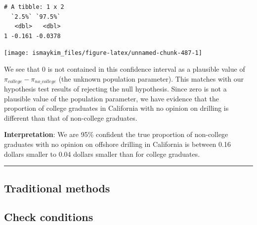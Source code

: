 \documentclass[12pt,]{krantz}
\makeatletter
\newenvironment{Shaded}{\begin{snugshade}}{\end{snugshade}}
\newcommand{\KeywordTok}[1]{\textcolor[rgb]{0.27,0.27,0.27}{\textbf{#1}}}
\newcommand{\DataTypeTok}[1]{\textcolor[rgb]{0.27,0.27,0.27}{#1}}
\newcommand{\StringTok}[1]{\textcolor[rgb]{0.5,0.5,0.5}{#1}}
\newcommand{\OperatorTok}[1]{\textcolor[rgb]{0.43,0.43,0.43}{\textbf{#1}}}
\newcommand{\NormalTok}[1]{#1}
\newenvironment{kframe}{%
\medskip{}
\setlength{\fboxsep}{.8em}
 \def\at@end@of@kframe{}%
 \ifinner\ifhmode%
  \def\at@end@of@kframe{\end{minipage}}%
  \begin{minipage}{\columnwidth}%
 \fi\fi%
 \def\FrameCommand##1{\hskip\@totalleftmargin \hskip-\fboxsep
 \colorbox{shadecolor}{##1}\hskip-\fboxsep
     \hskip-\linewidth \hskip-\@totalleftmargin \hskip\columnwidth}%
 \MakeFramed {\advance\hsize-\width
   \@totalleftmargin\z@ \linewidth\hsize
   \@setminipage}}%
 {\par\unskip\endMakeFramed%
 \at@end@of@kframe}
\renewenvironment{Shaded}{\begin{kframe}}{\end{kframe}}
\theoremstyle{definition}
\theoremstyle{definition}
\theoremstyle{definition}
\theoremstyle{remark}
\makeatother
\begin{document}
\begin{Shaded}
\end{Shaded}

\begin{verbatim}
# A tibble: 1 x 2
  `2.5%` `97.5%`
   <dbl>   <dbl>
1 -0.161 -0.0378
\end{verbatim}

\begin{Shaded}
\end{Shaded}

\begin{center}\texttt{[image: ismaykim\_files/figure-latex/unnamed-chunk-487-1]} \end{center}

We see that 0 is not contained in this confidence interval as a
plausible value of \(\pi_{college} - \pi_{no\_college}\) (the unknown
population parameter). This matches with our hypothesis test results of
rejecting the null hypothesis. Since zero is not a plausible value of
the population parameter, we have evidence that the proportion of
college graduates in California with no opinion on drilling is different
than that of non-college graduates.

\textbf{Interpretation}: We are 95\% confident the true proportion of
non-college graduates with no opinion on offshore drilling in California
is between 0.16 dollars smaller to 0.04 dollars smaller than for college
graduates.

\begin{center}\rule{0.5\linewidth}{\linethickness}\end{center}

\subsection{Traditional methods}\label{traditional-methods-2}

\subsection{Check conditions}\label{check-conditions-2}
\end{document}
